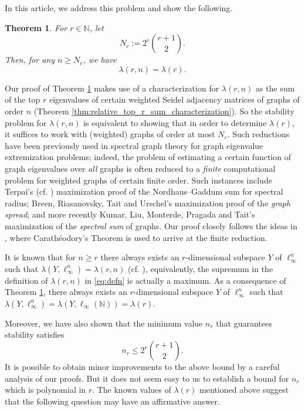 \documentclass[11pt]{article}
\theoremstyle{plain}
\newtheorem{theorem}{Theorem}[section]
\numberwithin{equation}{section}
\begin{document}
In this article, we address this problem and show the following. 

\begin{theorem}\label{thm:stability_rel_proj_constant} For $r\in \mathbb{N}$, let 
\[N_r:= 2^{r}{r+1\choose 2}.\]
Then, for any $n\ge N_r$, we have 
\[\lambda(r,n) = \lambda(r).\]
\end{theorem}

Our proof of Theorem \ref{thm:stability_rel_proj_constant} makes use of a characterization for $\lambda(r,n)$ as the sum of the top $r$ eigenvalues of certain weighted Seidel adjacency matrices of graphs of order $n$ (Theorem \ref{thm:relative_top_r_sum_characterization}). So the stability problem for $\lambda(r,n)$ is equivalent to showing that in order to determine $\lambda(r)$, it suffices to work with (weighted) graphs of order at most $N_r$. Such reductions have been previously used in spectral graph theory for graph eigenvalue extremization problems; indeed, the problem of estimating a certain function of graph eigenvalues over \emph{all} graphs is often reduced to a \emph{finite} computational problem for weighted graphs of certain finite order. Such instances include Terpai's \cite{Terpai_2011} 
(cf. \cite{Liu_2024}) maximization proof of the Nordhaus--Gaddum sum for spectral radius; Breen, Riasanovsky, Tait and Urschel's \cite{Breen_Riasanovsky_Tait_Urschel_2022} maximization 
proof of the \emph{graph spread}; and more recently Kumar, Liu, Monterde, Pragada and Tait's \cite{Kumar_Liu_Monterde_Pragada_Tait_2026}  maximization of the \emph{spectral sum} of graphs. Our proof closely follows the ideas in \cite{Kumar_Liu_Monterde_Pragada_Tait_2026}, where Carath\'eodory's Theorem is used to arrive at the finite reduction. 

It is known that for $n\ge r$ there always exists an $r$-dimensional subspace $Y$ of $\ell_\infty^n$ such that $\lambda(Y, \ell_\infty^n) = \lambda(r,n)$ (cf. \cite{Kobos_2025}), equivalently, the supremum in the definition of $\lambda(r,n)$ in \eqref{eq:defn} is actually a maximum. As a consequence of Theorem \ref{thm:stability_rel_proj_constant}, there always exists an $r$-dimensional subspace $Y$ of $\ell_\infty^n$ such that $\lambda(Y, \ell_\infty^n) = \lambda(Y, \ell_\infty(\mathbb{N})) = \lambda(r)$.

Moreover, we have also shown that the minimum value $n_r$ that guarantees stability satisfies
\[ n_r\le 2^r{r+1\choose 2}.\]
It is possible to obtain minor improvements to the above bound by a careful analysis of our proofs. But it does not seem easy to us to establish a bound for $n_r$ which is polynomial in $r$. The known values of $\lambda(r)$ mentioned above suggest that the following question may have an affirmative answer. 
\end{document}
